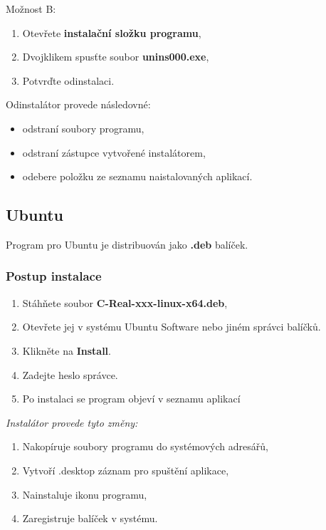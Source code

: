 \documentclass[12pt]{article}
\begin{document}
\noindent Možnost B:
\begin{enumerate}
    \item Otevřete \textbf{instalační složku programu},
    \item Dvojklikem spusťte soubor \textbf{unins000.exe},
    \item Potvrďte odinstalaci.
\end{enumerate}

\noindent Odinstalátor provede následovné:
\begin{itemize}
    \item odstraní soubory programu,
    \item odstraní zástupce vytvořené instalátorem,
    \item odebere položku ze seznamu naistalovaných aplikací.
\end{itemize}

\clearpage
\newpage

\subsection{Ubuntu}

Program pro Ubuntu je distribuován jako \textbf{.deb} balíček.

\subsubsection{Postup instalace}

\begin{enumerate}
    \item Stáhňete soubor \textbf{C-Real-xxx-linux-x64.deb},
    \item Otevřete jej v systému Ubuntu Software nebo jiném správci balíčků.
    \item Klikněte na \textbf{Install}.
    \item Zadejte heslo správce.
    \item Po instalaci se program objeví v seznamu aplikací
\end{enumerate}


\emph{Instalátor provede tyto změny:}
\begin{enumerate}
    \item Nakopíruje soubory programu do systémových adresářů,
    \item Vytvoří .desktop záznam pro spuštění aplikace,
    \item Nainstaluje ikonu programu,
    \item Zaregistruje balíček v systému.
\end{enumerate}
\end{document}
